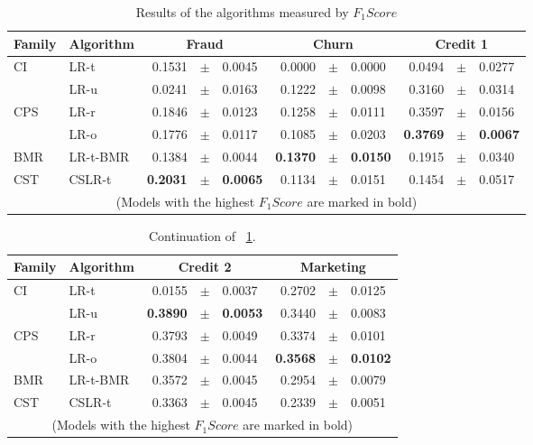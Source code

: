 \begin{table}
    \centering
    \footnotesize
    \begin{tabular}{l l r@{\hskip 0in}c@{\hskip 0in}l r@{\hskip 0in}c@{\hskip 0in}l r@{\hskip 
    0in}c@{\hskip 0in}l  } %
    \hline
    \bf{Family} & \bf{Algorithm} & \multicolumn{3}{c}{\bf{Fraud}} & 
    \multicolumn{3}{c}{\bf{Churn}} & \multicolumn{3}{c}{\bf{Credit 1}} \\ 
    \hline
CI&LR-t & 0.1531 &$\pm$& 0.0045 & 0.0000 &$\pm$& 0.0000 & 0.0494 &$\pm$& 0.0277\\ 
&LR-u & 0.0241 &$\pm$& 0.0163 & 0.1222 &$\pm$& 0.0098 & 0.3160 &$\pm$& 0.0314\\ 
\hline 
CPS&LR-r & 0.1846 &$\pm$& 0.0123 & 0.1258 &$\pm$& 0.0111 & 0.3597 &$\pm$& 0.0156\\ 
&LR-o & 0.1776 &$\pm$& 0.0117 & 0.1085 &$\pm$& 0.0203 & \bf{0.3769} &\bf{$\pm$}& \bf{0.0067}\\ 
\hline 
BMR&LR-t-BMR & 0.1384 &$\pm$& 0.0044 & \bf{0.1370} &\bf{$\pm$}& \bf{0.0150} & 0.1915 &$\pm$& 
0.0340\\ 
\hline 
CST&CSLR-t & \bf{0.2031} &\bf{$\pm$}& \bf{0.0065} & 0.1134 &$\pm$& 0.0151 & 0.1454 &$\pm$& 0.0517\\ 
\hline
  \multicolumn{11}{c}{(Models with the highest $F_1Score$ are marked in bold)}
  \end{tabular}
    \caption{Results of the algorithms measured by $F_1Score$}
    \label{tab:7:results_fscore}
  \end{table}
  
\begin{table}
    \centering
    \footnotesize
    \begin{tabular}{l l r@{\hskip 0in}c@{\hskip 0in}l r@{\hskip 0in}c@{\hskip 0in}l  } %
    \hline
    \bf{Family} & \bf{Algorithm} &  \multicolumn{3}{c}{\bf{Credit 2}} 
& \multicolumn{3}{c}{\bf{Marketing}} \\ 
    \hline
CI&LR-t & 0.0155 &$\pm$& 0.0037 & 0.2702 &$\pm$& 0.0125\\ 
&LR-u & \bf{0.3890} &\bf{$\pm$}& \bf{0.0053} & 0.3440 &$\pm$& 0.0083\\ 
\hline 
CPS&LR-r & 0.3793 &$\pm$& 0.0049 & 0.3374 &$\pm$& 0.0101\\ 
&LR-o & 0.3804 &$\pm$& 0.0044 & \bf{0.3568} &\bf{$\pm$}& \bf{0.0102}\\ 
\hline 
BMR&LR-t-BMR & 0.3572 &$\pm$& 0.0045 & 0.2954 &$\pm$& 0.0079\\ 
\hline 
CST&CSLR-t & 0.3363 &$\pm$& 0.0045 & 0.2339 &$\pm$& 0.0051\\ 
\hline 
  \multicolumn{8}{c}{(Models with the highest $F_1Score$ are marked in bold)}
  \end{tabular}
    \caption{Continuation of \tablename{~\ref{tab:7:results_fscore}}.}
    \label{tab:7:results_fscore2}
  \end{table}
  
